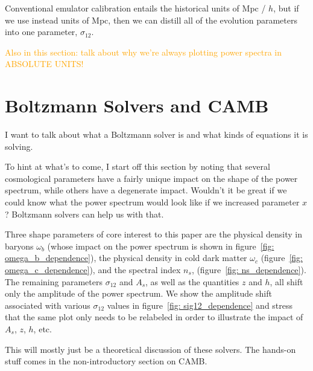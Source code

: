 
Conventional emulator calibration entails the historical units of Mpc / $h$,
but if we use instead units of Mpc, then we can distill all of the evolution
parameters into one parameter, $\sigma_{12}$. 

\textcolor{orange}{Also in this section: talk about why we're always plotting
power spectra in ABSOLUTE UNITS!}

\section{Boltzmann Solvers and CAMB}
\label{sec: boltzmann_intro}

I want to talk about what a Boltzmann solver is and what kinds of equations it is solving.

To hint at what's to come, I start off this section by noting that several cosmological parameters have a fairly unique impact on the shape of the power spectrum, while others have a degenerate impact. Wouldn't it be great if we could know what the power spectrum would look like if we increased parameter $x$? Boltzmann solvers can help us with that.


Three shape parameters of core interest to this paper are the physical density in baryons $\omega_b$ (whose impact on the power spectrum is shown in figure~\ref{fig: omega_b_dependence}), the physical density in cold dark matter $\omega_c$ (figure~\ref{fig: omega_c_dependence}), and the spectral index $n_s$, (figure~\ref{fig: ns_dependence}). The remaining parameters $\sigma_{12}$ and $A_s$, as well as the quantities $z$ and $h$, all shift only the amplitude of the power spectrum. We show the amplitude shift associated with various $\sigma_{12}$ values in figure~\ref{fig: sig12_dependence} and stress that the same plot only needs to be relabeled in order to illustrate the impact of $A_s$, $z$, $h$, etc. 


This will mostly just be a theoretical discussion of these solvers. The hands-on stuff comes in the non-introductory section on CAMB.


